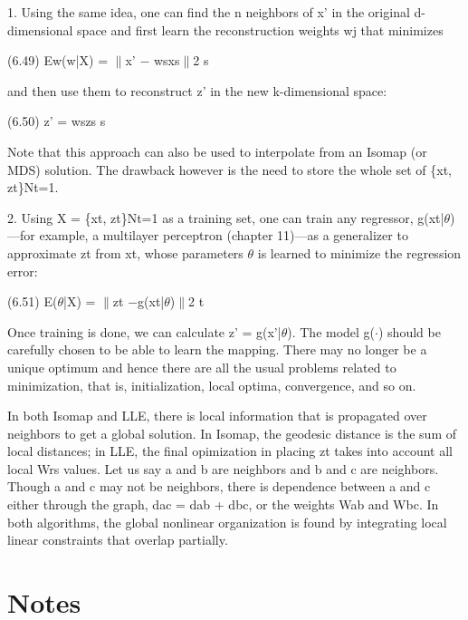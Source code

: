 1. Using the same idea, one can find the n neighbors of x' in the original d-dimensional space and first learn the reconstruction weights wj that minimizes

(6.49) Ew(w|X) = $\parallel$x' $-$ wsxs$\parallel$2 s

and then use them to reconstruct z' in the new k-dimensional space:

(6.50) z' = wszs s

Note that this approach can also be used to interpolate from an Isomap (or MDS) solution. The drawback however is the need to store the whole set of \{xt, zt\}Nt=1.

2. Using X = \{xt, zt\}Nt=1 as a training set, one can train any regressor, g(xt|$\theta$)---for example, a multilayer perceptron (chapter 11)---as a generalizer to approximate zt from xt, whose parameters $\theta$ is learned to minimize the regression error:

(6.51) E($\theta$|X) = $\parallel$zt $-$g(xt|$\theta$)$\parallel$2 t

Once training is done, we can calculate z' = g(x'|$\theta$). The model g($\cdot$) should be carefully chosen to be able to learn the mapping. There may no longer be a unique optimum and hence there are all the usual problems related to minimization, that is, initialization, local optima, convergence, and so on.

In both Isomap and LLE, there is local information that is propagated over neighbors to get a global solution. In Isomap, the geodesic distance is the sum of local distances; in LLE, the final opimization in placing zt takes into account all local Wrs values. Let us say a and b are neighbors and b and c are neighbors. Though a and c may not be neighbors, there is dependence between a and c either through the graph, dac = dab + dbc, or the weights Wab and Wbc. In both algorithms, the global nonlinear organization is found by integrating local linear constraints that overlap partially.

\section{Notes}

